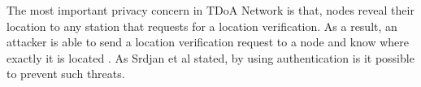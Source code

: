 The most important privacy concern in TDoA Network is that, nodes reveal their location to any station that requests for a location verification. As a result, an attacker is able to send a location verification request to a node and know where exactly it is located \cite{srivastava}. As Srdjan et al stated, by using authentication is it possible to prevent such threats.